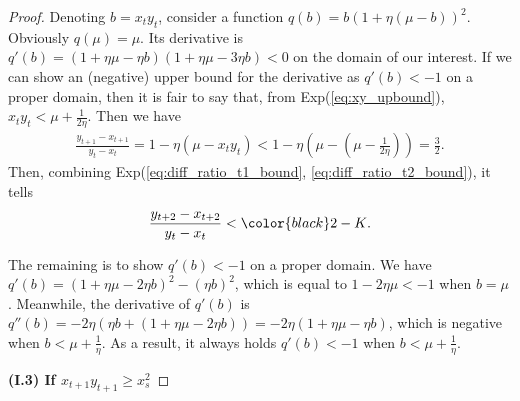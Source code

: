 \documentclass{article}
\theoremstyle{plain}
\theoremstyle{remark}
\newcommand{\red}[1]{{\color{black}#1}}
\begin{document}
\begin{proof}
Denoting $b=x_t y_t$, consider a function $q(b)=b\left(1+\eta\left(\mu-b\right)\right)^2$. Obviously $q(\mu)=\mu$. Its derivative is $q'(b)=\left(1+\eta\mu-
\eta b\right)\left(1+\eta\mu-3\eta b\right)<0$ on the domain of our interest. If we can show an (negative) upper bound for the derivative as $q'(b)<-1$ on a proper domain, then it is fair to say that, from Exp(\ref{eq:xy_upbound}), $x_t y_t<\mu+\frac{1}{2\eta}$. Then we have
\begin{align}
    \frac{y_{t+1}-x_{t+1}}{y_t-x_t}=1-\eta(\mu-x_t y_t)<1-\eta\left(\mu-\left(\mu-\frac{1}{2\eta}\right)\right)=\frac{3}{2}.
    \label{eq:diff_ratio_t1_bound}
\end{align}
Then, combining Exp(\ref{eq:diff_ratio_t1_bound}, \ref{eq:diff_ratio_t2_bound}), it tells
\begin{align}
    \frac{y_{t+2}-x_{t+2}}{y_{t}-x_{t}}<\red{2-K}.
    \label{eq:xydiff_rate2}
\end{align}

The remaining is to show $q'(b)<-1$ on a proper domain. We have $q'(b)=(1+\eta\mu-2\eta b)^2-(\eta b)^2$, which is equal to $1-2\eta\mu<-1$ when $b=\mu$. Meanwhile, the derivative of $q'(b)$ is $q''(b)=-2\eta(\eta b+(1+\eta\mu-2\eta b))=-2\eta(1+\eta\mu-\eta b)$, which is negative when $b<\mu+\frac{1}{\eta}$. As a result, it always holds $q'(b)<-1$ when $b<\mu+\frac{1}{\eta}$.

\textbf{(I.3) If $x_{t+1} y_{t+1}\ge x_s^2$}


\end{proof}
\end{document}
